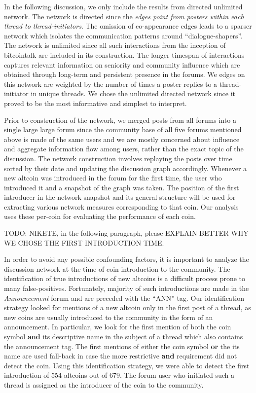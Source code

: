 In the following discussion, we only include the results from directed unlimited network.
The network is directed since the \textit{edges point from posters within each thread to thread-initiators}. The omission
of co-appearance edges leads to a sparser network which isolates the communication
patterns around ``dialogue-shapers''. The network is unlimited since all such interactions
from the inception of bitcointalk are included in its construction. The longer timespan
of interactions captures relevant information on seniority and community influence 
which are obtained through long-term and persistent presence in the forums.
We edges on this network are weighted by the number of times a poster replies
to a thread-initiator in unique threads. We chose the unlimited directed network
since it proved to be the most informative and simplest to interpret.

Prior to construction of the network, we merged posts from all forums into a
single large large forum since the community base of all five forums mentioned
above is made of the same users and we are mostly concerned about influence and
aggregate information flow among users, rather than the exact topic of the discussion.
The network construction involves replaying the posts over time sorted by their date and updating the
discussion graph accordingly. Whenever a new altcoin was introduced
in the forum for the first time, the user who introduced it and a snapshot of the graph was taken.
The position of the first introducer in the network snapshot and its general structure 
will be used for extracting various network measures corresponding to that coin. Our analysis
uses these per-coin for evaluating the performance of each coin.

TODO: NIKETE, in the following paragraph, please EXPLAIN BETTER WHY WE CHOSE THE FIRST INTRODUCTION TIME.

In order to avoid any possible confounding factors, it is important to analyze
the discussion network at the time of coin introduction to the community. The
identification of true introductions of new altcoins is a difficult process
prone to many false-positives. Fortunately, majority of such introductions are
made in the \textit{Announcement} forum and are preceded with the ``ANN'' tag.
Our identification strategy looked for mentions of a new altcoin only in the
first post of a thread, as new coins are usually introduced to the community in
the form of an announcement.  In particular, we look for the first mention of
both the coin symbol \textbf{and} its descriptive name in the subject of a
thread which also contains the announcement tag. The first mentions of either
the coin symbol \textbf{or} the its name are used fall-back in case the more
restrictive \textbf{and} requirement did not detect the coin.  Using this
identification strategy, we were able to detect the first introduction of 554 altcoins
out of 679. The forum user who initiated such a thread is assigned as the 
introducer of the coin to the community.


